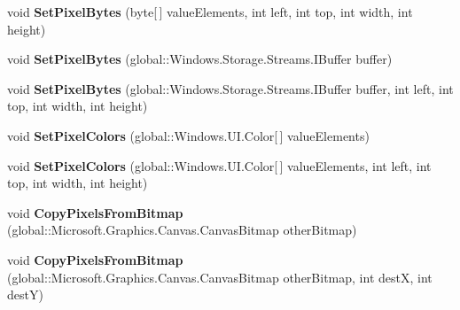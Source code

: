 \begin{DoxyCompactItemize}
\mbox{\label{interface_microsoft_1_1_graphics_1_1_canvas_1_1_i_canvas_bitmap_af373b13151ccbea6a489af0b71c86b6d}} 
void {\bfseries Set\+Pixel\+Bytes} (byte\mbox{[}$\,$\mbox{]} value\+Elements, int left, int top, int width, int height)
\item 
\mbox{\label{interface_microsoft_1_1_graphics_1_1_canvas_1_1_i_canvas_bitmap_a21c32cb7fb31c8fd6a1decdcb79876d2}} 
void {\bfseries Set\+Pixel\+Bytes} (global\+::\+Windows.\+Storage.\+Streams.\+I\+Buffer buffer)
\item 
\mbox{\label{interface_microsoft_1_1_graphics_1_1_canvas_1_1_i_canvas_bitmap_a593c5894545aa39d6cf008b46bef4972}} 
void {\bfseries Set\+Pixel\+Bytes} (global\+::\+Windows.\+Storage.\+Streams.\+I\+Buffer buffer, int left, int top, int width, int height)
\item 
\mbox{\label{interface_microsoft_1_1_graphics_1_1_canvas_1_1_i_canvas_bitmap_a925c9f849cf70be981d86d4e4aad1bd0}} 
void {\bfseries Set\+Pixel\+Colors} (global\+::\+Windows.\+U\+I.\+Color\mbox{[}$\,$\mbox{]} value\+Elements)
\item 
\mbox{\label{interface_microsoft_1_1_graphics_1_1_canvas_1_1_i_canvas_bitmap_ad139947e5dfa06e8b880c01a19016cf7}} 
void {\bfseries Set\+Pixel\+Colors} (global\+::\+Windows.\+U\+I.\+Color\mbox{[}$\,$\mbox{]} value\+Elements, int left, int top, int width, int height)
\item 
\mbox{\label{interface_microsoft_1_1_graphics_1_1_canvas_1_1_i_canvas_bitmap_a6e4c4209ff55c072d09a51c00a9d4653}} 
void {\bfseries Copy\+Pixels\+From\+Bitmap} (global\+::\+Microsoft.\+Graphics.\+Canvas.\+Canvas\+Bitmap other\+Bitmap)
\item 
\mbox{\label{interface_microsoft_1_1_graphics_1_1_canvas_1_1_i_canvas_bitmap_a5ab0cddef05eb80cffded7b872aacc34}} 
void {\bfseries Copy\+Pixels\+From\+Bitmap} (global\+::\+Microsoft.\+Graphics.\+Canvas.\+Canvas\+Bitmap other\+Bitmap, int destX, int destY)

\end{DoxyCompactItemize}
